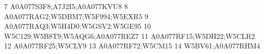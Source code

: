 \documentclass{beamer}
\begin{document}
\begin{frame}[fragile]
\begin{itemize}
\begin{Schunk}
\begin{Soutput}
7                                                                                                                                                                                                                                                                                                                                                    A0A077S3F8;A7J2I5;A0A077KVU8
8                                                                                                                                                                                                                                                                                                                                                 A0A077RAG2;W5DBM7;W5F994;W5EXR5
9                                                                                                                                                                                                                                                                                                                                                 A0A077RAQ3;W5H4D0;W5GSV2;W5GE95
10                                                                                                                                                                                                                                                                                                                                                W5C129;W5B8T9;W5AQG6;A0A077REZ7
11                                                                                                                                                                                                                                                                                                                                                       A0A077RF15;W5DH22;W5CLR2
12                                                                                                                                                                                                                                                                                                                                                              A0A077RF25;W5CLY9
13                                                                                                                                                                                                                                                                                                                                                              A0A077RF72;W5CM15
14                                                                                                                                                                                                                                                                                                                                                              W5BV61;A0A077RHM4

\end{Soutput}
\end{Schunk}
\end{itemize}
\end{frame}
\end{document}
